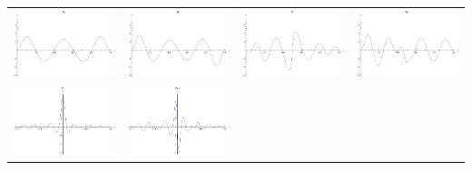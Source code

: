 \documentclass{article}
\begin{document}
\begin{landscape}
\begin{tabular}{cccc}
\includegraphics[width=5.0cm]{nonic_bspline_5.pdf}& \includegraphics[width=5.0cm]{nonic_bspline_6.pdf}& \includegraphics[width=5.0cm]{nonic_bspline_7.pdf}& \includegraphics[width=5.0cm]{nonic_bspline_8.pdf} \\
\includegraphics[width=5.0cm]{nonic_bspline_9.pdf}& \includegraphics[width=5.0cm]{nonic_bspline_10.pdf}\end{tabular} 
 \end{landscape}
\end{document}

